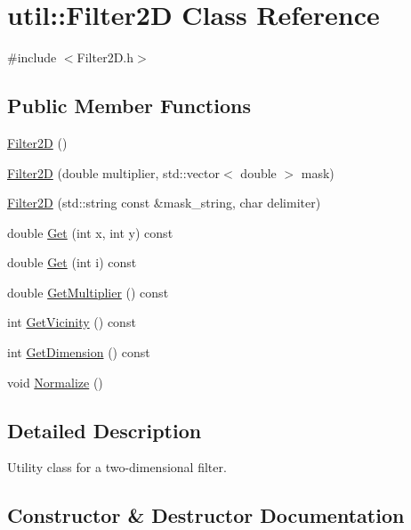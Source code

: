 \hypertarget{classutil_1_1Filter2D}{}\section{util\+:\+:Filter2D Class Reference}
\label{classutil_1_1Filter2D}


{\ttfamily \#include $<$Filter2\+D.\+h$>$}

\subsection*{Public Member Functions}
\begin{DoxyCompactItemize}
\item 
\hyperlink{classutil_1_1Filter2D_a56cbb0d40a118f98c5a21d1b0a9e1953}{Filter2D} ()
\item 
\hyperlink{classutil_1_1Filter2D_a83896f35678afd4a024b2ae0255b3e38}{Filter2D} (double multiplier, std\+::vector$<$ double $>$ mask)
\item 
\hyperlink{classutil_1_1Filter2D_a1d14212292766b1372b190842d8330e8}{Filter2D} (std\+::string const \&mask\+\_\+string, char delimiter)
\item 
double \hyperlink{classutil_1_1Filter2D_ab59311cc1727f5285a56c050ede7b14a}{Get} (int x, int y) const
\item 
double \hyperlink{classutil_1_1Filter2D_ad6866d21e5b1d3d6863d859f1b7fa288}{Get} (int i) const
\item 
double \hyperlink{classutil_1_1Filter2D_a2b61ed6deaebb2e97fda04cadd43459c}{Get\+Multiplier} () const
\item 
int \hyperlink{classutil_1_1Filter2D_af273117c197dc90208167cd873fe0097}{Get\+Vicinity} () const
\item 
int \hyperlink{classutil_1_1Filter2D_a4151856406f7a794cd724ce4a7e347eb}{Get\+Dimension} () const
\item 
void \hyperlink{classutil_1_1Filter2D_a242138102e2e30f4fe9cccf76f817e09}{Normalize} ()
\end{DoxyCompactItemize}


\subsection{Detailed Description}
Utility class for a two-\/dimensional filter. 

\subsection{Constructor \& Destructor Documentation}

